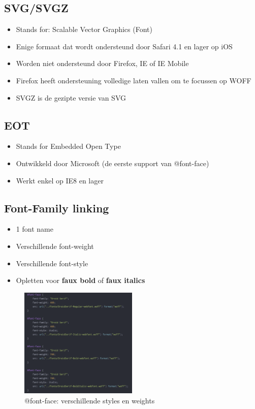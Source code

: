 \documentclass{article}
\newcommand{\bold}[1]{\textbf{#1}}
\begin{document}
\subsection{SVG/SVGZ}

\begin{itemize}
    \item Stands for: Scalable Vector Graphics (Font)
    \item Enige formaat dat wordt ondersteund door Safari 4.1 en lager op iOS
    \item Worden niet ondersteund door Firefox, IE of IE Mobile
    \item Firefox heeft ondersteuning volledige laten vallen om te focussen op WOFF
    \item SVGZ is de gezipte versie van SVG
\end{itemize}

\subsection{EOT}

\begin{itemize}
    \item Stands for Embedded Open Type
    \item Ontwikkeld door Microsoft (de eerste support van @font-face)
    \item Werkt enkel op IE8 en lager
\end{itemize}

\subsection{Font-Family linking}
\begin{itemize}
    \item 1 font name
    \item Verschillende font-weight
    \item Verschillende font-style
    \item Opletten voor \bold{faux bold} of \bold{faux italics}
\end{itemize}

\begin{figure}[H]
    \centering
    \includegraphics[width=0.5\textwidth]{img/font-faces2.png}
    \caption{@font-face: verschillende styles en weights}
\end{figure}
\end{document}
